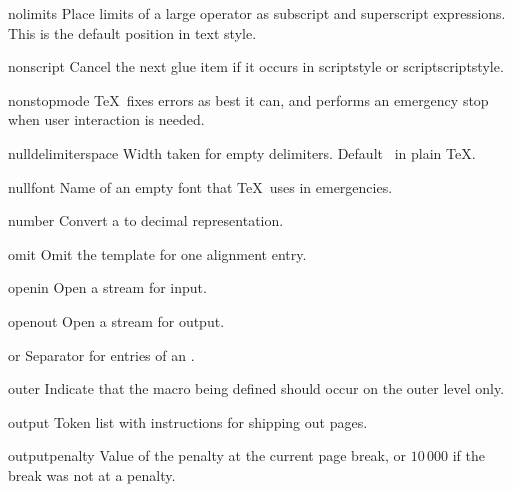 \item nolimits
      Place limits of a large operator as subscript and 
      superscript expressions.
      This is the default position in text style.

\item nonscript
      Cancel the next glue item if it occurs in 
      scriptstyle or scriptscriptstyle.

\item nonstopmode
      \TeX\ fixes errors as best it can,
      and performs an emergency stop
      when user interaction is needed.

\item nulldelimiterspace
      Width taken for empty delimiters. 
      Default~\n{1.2pt} in plain \TeX.

\item nullfont
      Name of an empty font that \TeX\ uses in emergencies.

\item number
      Convert a
       to decimal representation. 

\item omit
      Omit the template for one alignment entry.

\item openin
      Open a stream for input.

\item openout
      Open a stream for output.

\item or
      Separator for entries of an .

\item outer
      Indicate that the macro being defined 
      should occur on the outer level only.

\item output
      Token list with instructions for shipping out pages.

\item outputpenalty  
      Value of the penalty at the current page break,
      or $10\,000$ if the break was not at a penalty.

